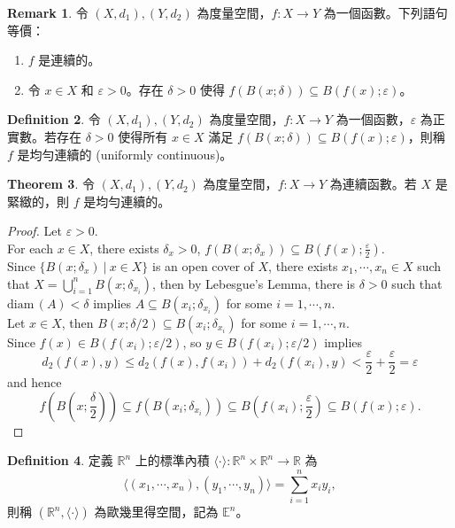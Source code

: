 \documentclass[12pt]{article}
\theoremstyle{definition}
\newtheorem{definition}{Definition}[section]
\newtheorem{theorem}[definition]{Theorem}
\newtheorem{remark}[definition]{Remark}
\newcommand\<{\langle}
\renewcommand\>{\rangle}
\newcommand\diam{\mathrm{diam}\hspace{2pt}}
\begin{document}
\begin{CJK}{UTF8}{bsmi}
\begin{remark}
    令 $(X, d_1), (Y, d_2)$ 為度量空間，$f:X\to Y$ 為一個函數。下列語句等價：
    \begin{enumerate}
        \item $f$ 是連續的。
        \item 令 $x\in X$ 和 $\varepsilon>0$。存在 $\delta>0$ 使得 $f(B(x; \delta))\subseteq B(f(x); \varepsilon)$。
    \end{enumerate}
\end{remark}

\begin{definition}
    令 $(X, d_1), (Y, d_2)$ 為度量空間，$f:X\to Y$ 為一個函數，$\varepsilon$ 為正實數。若存在 $\delta>0$ 使得所有 $x\in X$ 滿足 $f(B(x; \delta))\subseteq B(f(x); \varepsilon)$，則稱 $f$ 是均勻連續的 (uniformly continuous)。
\end{definition}

\begin{theorem}
    令 $(X, d_1), (Y, d_2)$ 為度量空間，$f:X\to Y$ 為連續函數。若 $X$ 是緊緻的，則 $f$ 是均勻連續的。
\end{theorem}
\begin{proof}
    Let $\varepsilon>0$. \\
    For each $x\in X$, there exists $\delta_x>0$, $f(B(x; \delta_x))\subseteq B(f(x); \frac{\varepsilon}{2})$. \\
    Since $\{B(x; \delta_x)\ |\ x\in X\}$ is an open cover of $X$, there exists $x_1, \cdots, x_n\in X$ such that $X=\bigcup_{i=1}^n B(x; \delta_{x_i})$, then by Lebesgue's Lemma, there is $\delta>0$ such that $\diam(A)<\delta$ implies $A\subseteq B(x_i; \delta_{x_i})$ for some $i=1, \cdots, n$. \\
    Let $x\in X$, then $B(x; \delta/2)\subseteq B(x_i; \delta_{x_i})$ for some $i=1, \cdots, n$. \\
    Since $f(x)\in B(f(x_i); \varepsilon/2)$, so $y\in B(f(x_i); \varepsilon/2)$ implies 
    \[
        d_2(f(x), y)\le d_2(f(x), f(x_i))+d_2(f(x_i), y)<\frac{\varepsilon}{2}+\frac{\varepsilon}{2}=\varepsilon
    \]
    and hence
    \[
        f\left(B\left(x; \frac{\delta}{2}\right)\right)\subseteq f(B(x_i; \delta_{x_i}))\subseteq B\left(f(x_i); \frac{\varepsilon}{2}\right)\subseteq B(f(x); \varepsilon).
    \]
\end{proof}

\begin{definition}
    定義 $\mathbb{R}^n$ 上的標準內積 $\<\cdot\>:\mathbb{R}^n\times\mathbb{R}^n\to\mathbb{R}$ 為
    \[
        \<(x_1, \cdots, x_n), (y_1, \cdots, y_n)\>
        = \sum_{i=1}^n x_i y_i,
    \]
    則稱 $(\mathbb{R}^n, \<\cdot\>)$ 為歐幾里得空間，記為 $\mathbb{E}^n$。
\end{definition}


\end{CJK}
\end{document}
